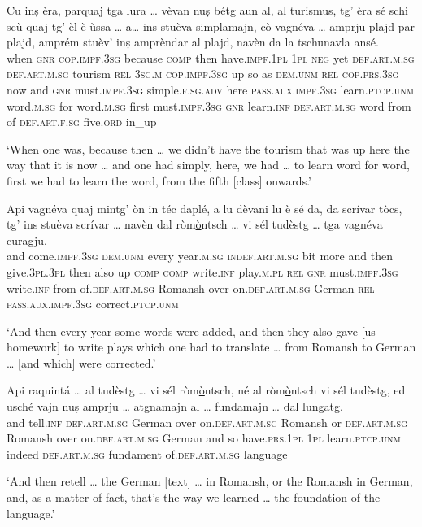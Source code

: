 \begin{linenumbers}
	\gll    Cu inṣ èra, parquaj tga lura … vèvan nuṣ bétg aun al, al turismus, tg’ èra sé schi scù quaj tg’ èl è ùssa … a… ins stuèva simplamajn, cò vagnéva …  amprju plajd par plajd, amprém stuèv’ inṣ amprèndar al plajd, navèn da la tschunavla ansé.\\
	when \textsc{gnr} \textsc{cop.impf.3sg} because \textsc{comp} then {} have.\textsc{impf.1pl} \textsc{1pl} \textsc{neg} yet \textsc{def.art.m.sg} \textsc{def.art.m.sg} tourism \textsc{rel} \textsc{3sg.m} \textsc{cop.impf.3sg} up so as \textsc{dem.unm} \textsc{rel} \textsc{cop.prs.3sg} now {} and \textsc{gnr} must.\textsc{impf.3sg} simple.\textsc{f.sg.adv} here \textsc{pass.aux.impf.3sg} {} learn.\textsc{ptcp.unm} word.\textsc{m.sg} for word.\textsc{m.sg} first must.\textsc{impf.3sg} \textsc{gnr} learn.\textsc{inf} \textsc{def.art.m.sg} word from of \textsc{def.art.f.sg} five.\textsc{ord} in\_up\\
\end{linenumbers}
\medskip
\glt `When one was, because then … we didn’t have the tourism that was up here the way that it is now … and one had simply, here, we had … to learn word for word, first we had to learn the word, from the fifth [class] onwards.'
\medskip

\begin{linenumbers}
	\gll    Api vagnéva quaj mintg’ òn in téc daplé, a lu dèvani lu è sé da, da scrívar tòcs, tg’ ins stuèva scrívar … navèn dal ròm\underline{ò}ntsch … vi sél tudèstg … tga vagnéva curagju.\\
	and come.\textsc{impf.3sg} \textsc{dem.unm} every year.\textsc{m.sg} \textsc{indef.art.m.sg} bit more and then give.\textsc{3pl.3pl} then also up \textsc{comp} \textsc{comp} write.\textsc{inf} play.\textsc{m.pl} \textsc{rel} \textsc{gnr} must.\textsc{impf.3sg} write.\textsc{inf} {} from  of.\textsc{def.art.m.sg} Romansh {} over on.\textsc{def.art.m.sg} German {} \textsc{rel} \textsc{pass.aux.impf.3sg} correct.\textsc{ptcp.unm}\\
\end{linenumbers}
\medskip
\glt `And then every year some words were added, and then they also gave [us homework] to write plays which one had to translate … from Romansh to German … [and which] were corrected.'
\medskip

\begin{linenumbers}
	\gll    Api raquintá … al tudèstg … vi sél ròm\underline{ò}ntsch, né al ròm\underline{ò}ntsch vi sél tudèstg, ed usché vajn nuṣ amprju … atgnamajn al … fundamajn … dal  lungatg.\\
	and tell.\textsc{inf} {} \textsc{def.art.m.sg} German {} over on.\textsc{def.art.m.sg} Romansh or  \textsc{def.art.m.sg} Romansh over  on.\textsc{def.art.m.sg} German and so have.\textsc{prs.1pl} \textsc{1pl} learn.\textsc{ptcp.unm} {} indeed \textsc{def.art.m.sg} {} fundament {} of.\textsc{def.art.m.sg} language\\
\end{linenumbers}
\medskip
\glt `And then retell … the German [text] … in Romansh, or the Romansh in German, and, as a matter of fact, that’s the way we learned … the foundation of the language.'
\medskip


